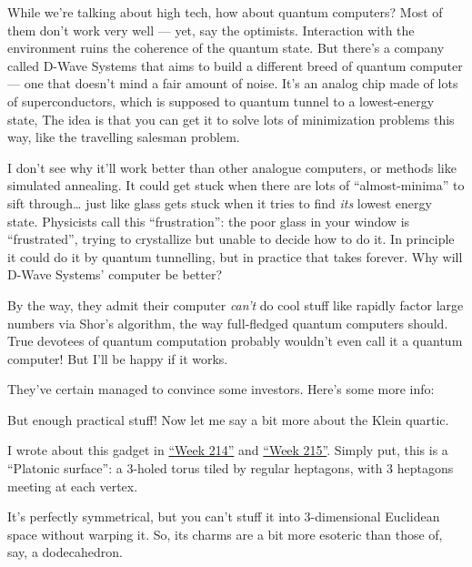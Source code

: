 \documentclass{article}
\def\tightlist{}
\renewcommand{\texttt}[1]{%
  \begingroup
  \ttfamily
  \begingroup\lccode`~=`/\lowercase{\endgroup\def~}{/\discretionary{}{}{}}%
  \begingroup\lccode`~=`[\lowercase{\endgroup\def~}{[\discretionary{}{}{}}%
  \begingroup\lccode`~=`.\lowercase{\endgroup\def~}{.\discretionary{}{}{}}%
  \catcode`/=\active\catcode`[=\active\catcode`.=\active
  \scantokens{#1\noexpand}%
  \endgroup
}
\begin{document}
While we're talking about high tech, how about quantum computers? Most
of them don't work very well --- yet, say the optimists. Interaction
with the environment ruins the coherence of the quantum state. But
there's a company called D-Wave Systems that aims to build a different
breed of quantum computer --- one that doesn't mind a fair amount of
noise. It's an analog chip made of lots of superconductors, which is
supposed to quantum tunnel to a lowest-energy state, The idea is that
you can get it to solve lots of minimization problems this way, like the
travelling salesman problem.

I don't see why it'll work better than other analogue computers, or
methods like simulated annealing. It could get stuck when there are lots
of ``almost-minima'' to sift through\ldots{} just like glass gets stuck
when it tries to find \emph{its} lowest energy state. Physicists call
this ``frustration'': the poor glass in your window is ``frustrated'',
trying to crystallize but unable to decide how to do it. In principle it
could do it by quantum tunnelling, but in practice that takes forever.
Why will D-Wave Systems' computer be better?

By the way, they admit their computer \emph{can't} do cool stuff like
rapidly factor large numbers via Shor's algorithm, the way full-fledged
quantum computers should. True devotees of quantum computation probably
wouldn't even call it a quantum computer! But I'll be happy if it works.

They've certain managed to convince some investors. Here's some more
info:


But enough practical stuff! Now let me say a bit more about the Klein
quartic.

I wrote about this gadget in \protect\hyperlink{week214}{``Week 214''}
and \protect\hyperlink{week215}{``Week 215''}. Simply put, this is a
``Platonic surface'': a \(3\)-holed torus tiled by regular heptagons,
with 3 heptagons meeting at each vertex.

It's perfectly symmetrical, but you can't stuff it into
\(3\)-dimensional Euclidean space without warping it. So, its charms are
a bit more esoteric than those of, say, a dodecahedron.
\end{document}
